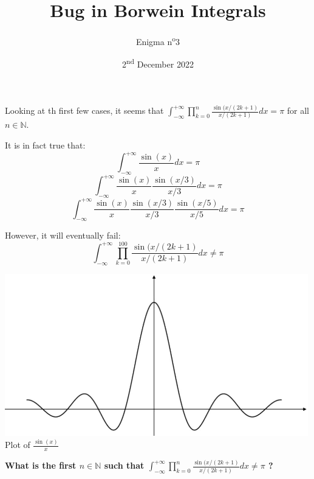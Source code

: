 \documentclass[a4paper, top=10mm]{article}
\title{\textbf{\huge{Bug in Borwein Integrals}}}
\author{Enigma n\textsuperscript{o}3}
\date{2\textsuperscript{nd} December 2022}
\begin{document}
	\maketitle
	
	Looking at th first few cases, it seems that
	$
	\int_{-\infty}^{+\infty} \prod_{k=0}^{n} \frac{\sin(x/(2k+1)}{x/(2k+1)} dx = \pi
	$
	for all $n \in \mathbb{N}$.
	
	It is in fact true that:
	$$
	\int_{-\infty}^{+\infty} \frac{\sin(x)}{x} dx = \pi
	$$
	$$
	\int_{-\infty}^{+\infty} \frac{\sin(x)}{x}\frac{\sin(x/3)}{x/3} dx = \pi
	$$
	$$
	\int_{-\infty}^{+\infty} \frac{\sin(x)}{x}\frac{\sin(x/3)}{x/3}\frac{\sin(x/5)}{x/5} dx = \pi
	$$
	
	However, it will eventually fail:
	$$
	\int_{-\infty}^{+\infty} \prod_{k=0}^{100} \frac{\sin(x/(2k+1)}{x/(2k+1)} dx \neq \pi
	$$

	\vspace{1cm}

	\begin{center}
		\includegraphics[height=200pt]{03sinc_plot.jpg}\\
		Plot of $\frac{\sin(x)}{x}$
	\end{center}

	\vspace{3cm}
	
	\textbf{What is the first $n \in \mathbb{N}$ such that 
	$
	\int_{-\infty}^{+\infty} \prod_{k=0}^{n} \frac{\sin(x/(2k+1)}{x/(2k+1)} dx \neq \pi
	$
	?}
	
\end{document}
